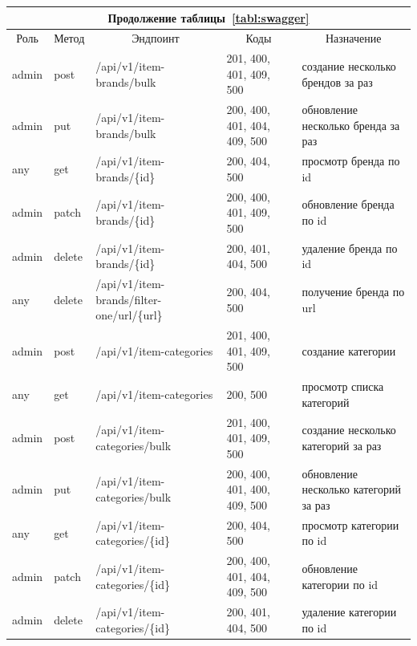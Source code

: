 \begin{table}
    \small

    \begin{tabular}{|p{1cm}|p{1cm}|p{8.5cm}|p{4.8cm}|p{8.5cm}|}
        \multicolumn{5}{c}{Продолжение таблицы~\ref{tabl:swagger}} \\
        \hline
        \multicolumn{1}{|c|}{Роль}
        & \multicolumn{1}{c|}{Метод}
        & \multicolumn{1}{c|}{Эндпоинт}
        & \multicolumn{1}{c|}{Коды}
        & \multicolumn{1}{c|}{Назначение}
        \\ \hline
        admin & post & /api/v1/item-brands/bulk & 201, 400, 401, 409, 500 & создание несколько брендов за раз \\ \hline 
        admin & put & /api/v1/item-brands/bulk & 200, 400, 401, 404, 409, 500 & обновление несколько бренда за раз \\ \hline
        any & get & /api/v1/item-brands/\{id\} & 200, 404, 500 & просмотр бренда по id \\ \hline 
        admin & patch & /api/v1/item-brands/\{id\} & 200, 400, 401, 409, 500 & обновление бренда по id \\ \hline 
        admin & delete & /api/v1/item-brands/\{id\} & 200, 401, 404, 500 & удаление бренда по id \\ \hline 
        any & delete & /api/v1/item-brands/filter-one/url/\{url\} & 200, 404, 500 & получение бренда по url \\ \hline 
        admin & post & /api/v1/item-categories & 201, 400, 401, 409, 500 & создание категории \\ \hline 
        any & get & /api/v1/item-categories & 200, 500 & просмотр списка категорий \\ \hline 
        admin & post & /api/v1/item-categories/bulk & 201, 400, 401, 409, 500 & создание несколько категорий за раз \\ \hline 
        admin & put & /api/v1/item-categories/bulk & 200, 400, 401, 400, 409, 500 & обновление несколько категорий за раз \\ \hline 
        any & get & /api/v1/item-categories/\{id\} & 200, 404, 500 & просмотр категории по id \\ \hline 
        admin & patch & /api/v1/item-categories/\{id\} & 200, 400, 401, 404, 409, 500 & обновление категории по id \\ \hline 
        admin & delete & /api/v1/item-categories/\{id\} & 200, 401, 404, 500 & удаление категории по id \\ \hline 

\end{tabular}
\end{table}
